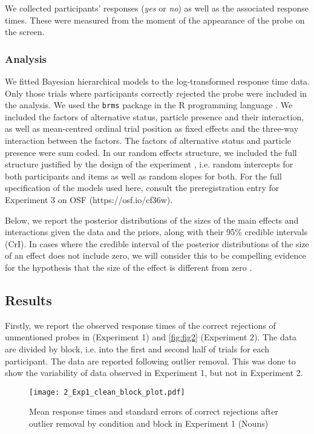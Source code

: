 \documentclass[output=paper,colorlinks,citecolor=brown]{langscibook}
\begin{document}
We collected participants' responses (\textit{yes} or \textit{no}) as well as the associated response times. These were measured from the moment of the appearance of the probe on the screen.

\subsubsection{Analysis}

We fitted Bayesian hierarchical models to the log-transformed response time data. Only those trials where participants correctly rejected the probe were included in the analysis. We used the \texttt{brms} package \citep{Burkner2017} in the R programming language \citep{RCoreTeam}. We included the factors of alternative status, particle presence and their interaction, as well as mean-centred ordinal trial position as fixed effects and the three-way interaction between the factors. The factors of alternative status and particle presence were sum coded. In our random effects structure, we included the full structure justified by the design of the experiment \citep{barr2013random}, i.e. random intercepts for both participants and items as well as random slopes for both. For the full specification of the models used here, consult the preregistration entry for Experiment 3 on OSF (https://osf.io/cf36w). 

Below, we report the posterior distributions of the sizes of the main effects and interactions given the data and the priors, along with their 95\% credible intervals (CrI). In cases where the credible interval of the posterior distributions of the size of an effect does not include zero, we will consider this to be compelling evidence for the hypothesis that the size of the effect is different from zero \citep{franke2019bayesian}. 

\subsection{Results}
Firstly, we report the observed response times of the correct rejections of unmentioned probes in  (Experiment 1) and \ref{fig:fig2} (Experiment 2). The data are divided by block, i.e. into the first and second half of trials for each participant. The data are reported following outlier removal. This was done to show the variability of data observed in Experiment 1, but not in Experiment 2.

\begin{figure}[p]
\texttt{[image: 2\_Exp1\_clean\_block\_plot.pdf]}
\caption{Mean response times and standard errors of correct rejections after outlier removal by condition and block in Experiment 1 (Nouns)}
\label{fig:fig1}
\end{figure}
\end{document}
